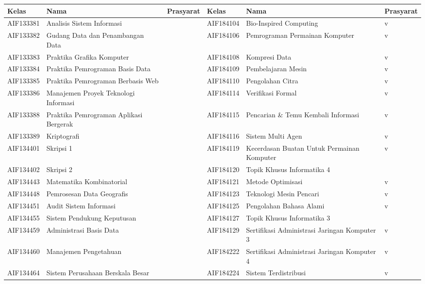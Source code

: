 \begin{enumerate}
\begin{table}[H]
\centering
\label{tab:kelasmatakuliah2018_rincian_2}
\begin{tabular}{|p{2cm}|p{3.5cm}|p{1.75cm}|p{2cm}|p{3.5cm}|p{1.75cm}|}
\hline
\textbf{Kelas} & \textbf{Nama} & \textbf{Prasyarat} & \textbf{Kelas} & \textbf{Nama} & \textbf{Prasyarat} \\ \hline
AIF133381 & Analisis Sistem Informasi &  & AIF184104 & Bio-Inspired Computing & v \\ \hline
AIF133382 & Gudang Data dan Penambangan Data &  & AIF184106 & Pemrograman Permainan Komputer & v \\ \hline
AIF133383 & Praktika Grafika Komputer &  & AIF184108 & Kompresi Data & v \\ \hline
AIF133384 & Praktika Pemrograman Basis Data &  & AIF184109 & Pembelajaran Mesin & v \\ \hline
AIF133385 & Praktika Pemrograman Berbasis Web &  & AIF184110 & Pengolahan Citra & v \\ \hline
AIF133386 & Manajemen Proyek Teknologi Informasi &  & AIF184114 & Verifikasi Formal & v \\ \hline
AIF133388 & Praktika Pemrograman Aplikasi Bergerak &  & AIF184115 & Pencarian \& Temu Kembali Informasi & v \\ \hline
AIF133389 & Kriptografi &  & AIF184116 & Sistem Multi Agen & v \\ \hline
AIF134401 & Skripsi 1 &  & AIF184119 & Kecerdasan Buatan Untuk Permainan Komputer & v \\ \hline
AIF134402 & Skripsi 2 & & AIF184120 & Topik Khusus Informatika 4 & \\ \hline
AIF134443 & Matematika Kombinatorial &  & AIF184121 & Metode Optimisasi & v \\ \hline
AIF134448 & Pemrosesan Data Geografis &  & AIF184123 & Teknologi Mesin Pencari & v \\ \hline
AIF134451 & Audit Sistem Informasi &  & AIF184125 & Pengolahan Bahasa Alami & v \\ \hline
AIF134455 & Sistem Pendukung Keputusan & & AIF184127 & Topik Khusus Informatika 3 & \\ \hline
AIF134459 & Administrasi Basis Data &  & AIF184129 & Sertifikasi Administrasi Jaringan Komputer 3 & v \\ \hline
AIF134460 & Manajemen Pengetahuan &  & AIF184222 & Sertifikasi Administrasi Jaringan Komputer 4 & v \\ \hline
AIF134464 & Sistem Perusahaan Berskala Besar &  & AIF184224 & Sistem Terdistribusi & v \\ \hline

\end{tabular}
\end{table}
\end{enumerate}
